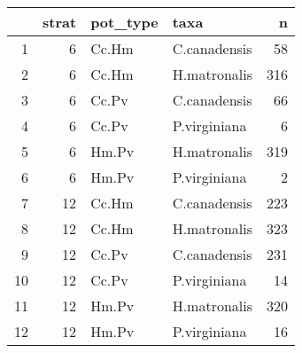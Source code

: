 \documentclass{article}\usepackage[]{graphicx}\usepackage[]{color}
\begin{document}
\begin{table}[ht]
\centering
\begin{tabular}{rrllr}
  \hline
 & strat & pot\_type & taxa & n \\ 
  \hline
1 &   6 & Cc.Hm & C.canadensis &  58 \\ 
  2 &   6 & Cc.Hm & H.matronalis & 316 \\ 
  3 &   6 & Cc.Pv & C.canadensis &  66 \\ 
  4 &   6 & Cc.Pv & P.virginiana &   6 \\ 
  5 &   6 & Hm.Pv & H.matronalis & 319 \\ 
  6 &   6 & Hm.Pv & P.virginiana &   2 \\ 
  7 &  12 & Cc.Hm & C.canadensis & 223 \\ 
  8 &  12 & Cc.Hm & H.matronalis & 323 \\ 
  9 &  12 & Cc.Pv & C.canadensis & 231 \\ 
  10 &  12 & Cc.Pv & P.virginiana &  14 \\ 
  11 &  12 & Hm.Pv & H.matronalis & 320 \\ 
  12 &  12 & Hm.Pv & P.virginiana &  16 \\ 
   \hline
\end{tabular}
\end{table}
\end{document}
